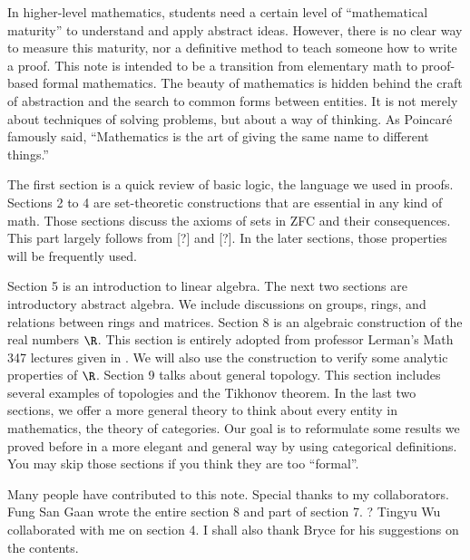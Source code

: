 \documentclass[10pt]{article}
\begin{document}
\hstart
\par
In higher-level mathematics, students need a certain level of ``mathematical maturity'' to understand and apply abstract ideas. However, there is no clear way to measure this maturity, nor a definitive method to teach someone how to write a proof. This note is intended to be a transition from elementary math to proof-based formal mathematics. The beauty of mathematics is hidden behind the craft of abstraction and  the search to common forms between entities. It is not merely about techniques of solving problems, but about a way of thinking. As Poincaré famously said, ``Mathematics is the art of giving the same name to different things.''
\par
The first section is a quick review of basic logic, the language we used in proofs. Sections 2 to 4 are set-theoretic constructions that are essential in any kind of math. Those sections discuss the axioms of sets in ZFC and their consequences. This part largely follows from [?] and [?].  In the later sections, those properties will be frequently used.
\par
Section 5 is an introduction to linear algebra.
The next two sections are introductory abstract algebra. We include discussions on groups, rings, and relations between rings and matrices. Section 8 is an algebraic construction of the real numbers $\R$. This section is entirely adopted from professor Lerman's Math 347 lectures given in . We will also use the construction to verify some analytic properties of $\R$. Section 9 talks about general topology. This section includes several examples of topologies and the Tikhonov theorem. In the last two sections, we offer a more general theory to think about every entity in mathematics, the theory of categories. Our goal is to reformulate some results we proved before in a more elegant and general way by using categorical definitions. You may skip those sections if you think they are too ``formal''.
\par
Many people have contributed to this note. Special thanks to my collaborators. Fung San Gaan wrote the entire section 8 and part of section 7. 
? 
Tingyu Wu collaborated with me on section 4. I shall also thank Bryce for his suggestions on the contents.
\end{document}
